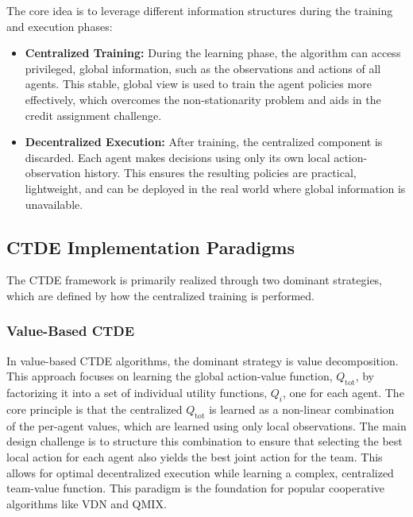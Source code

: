The core idea is to leverage different information structures during the training and execution phases:
\begin{itemize}
    \item \textbf{Centralized Training:} During the learning phase, the algorithm can access privileged, global information, such as the observations and actions of all agents. This stable, global view is used to train the agent policies more effectively, which overcomes the non-stationarity problem and aids in the credit assignment challenge.
    \item \textbf{Decentralized Execution:} After training, the centralized component is discarded. Each agent makes decisions using only its own local action-observation history. This ensures the resulting policies are practical, lightweight, and can be deployed in the real world where global information is unavailable.
\end{itemize}
\subsection{CTDE Implementation Paradigms}
The CTDE framework is primarily realized through two dominant strategies, which are defined by how the centralized training is performed.

\subsubsection{Value-Based CTDE}
In value-based CTDE algorithms, the dominant strategy is value decomposition. This approach focuses on learning the global action-value function, $Q_{\text{tot}}$, by factorizing it into a set of individual utility functions, $Q_i$, one for each agent. The core principle is that the centralized $Q_{\text{tot}}$ is learned as a non-linear combination of the per-agent values, which are learned using only local observations. The main design challenge is to structure this combination to ensure that selecting the best local action for each agent also yields the best joint action for the team. This allows for optimal decentralized execution while learning a complex, centralized team-value function. This paradigm is the foundation for popular cooperative algorithms like VDN\parencite{VDN} and QMIX\parencite{QMIX}.

